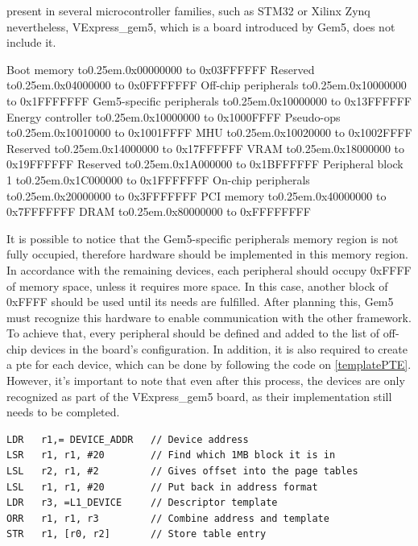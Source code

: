 present in several microcontroller families, such as STM32 \cite{referenceManualRM0385} or Xilinx Zynq \cite{xilinx2014zynq} 
nevertheless, VExpress\_gem5, which is a board introduced by Gem5, does not include it.


\def\mydots{\xleaders\hbox to0.25em{\hfill.\hfill}\hfill}

\begin{outline}[enumerate]
	\1 Boot memory 						\mydots 	0x00000000 to 0x03FFFFFF
	\1 Reserved							\mydots 	0x04000000 to 0x0FFFFFFF
	\1 Off-chip peripherals				\mydots 	0x10000000 to 0x1FFFFFFF
		\2 Gem5-specific peripherals	\mydots 	0x10000000 to 0x13FFFFFF
			\3 Energy controller 		\mydots 	0x10000000 to 0x1000FFFF
			\3 Pseudo-ops				\mydots		0x10010000 to 0x1001FFFF
			\3 MHU						\mydots		0x10020000 to 0x1002FFFF
		\2 Reserved 					\mydots 	0x14000000 to 0x17FFFFFF
		\2 VRAM							\mydots		0x18000000 to 0x19FFFFFF
		\2 Reserved 					\mydots		0x1A000000 to 0x1BFFFFFF
		\2 Peripheral block 1			\mydots		0x1C000000 to 0x1FFFFFFF
	\1 On-chip  peripherals				\mydots 	0x20000000 to 0x3FFFFFFF
	\1 PCI memory 						\mydots 	0x40000000 to 0x7FFFFFFF
	\1 DRAM								\mydots 	0x80000000 to 0xFFFFFFFF
\end{outline}

It is possible to notice that the Gem5-specific peripherals memory region is not fully occupied, therefore hardware should be implemented 
in this memory region. In accordance with the remaining devices, each peripheral should occupy 0xFFFF of memory space, unless it requires
more space. In this case, another block of 0xFFFF should be used until its needs are fulfilled. After planning this, Gem5 must recognize 
this hardware to enable communication with the other framework. 
To achieve that, every peripheral should be defined and added to the list of off-chip devices in the 
board's configuration. In addition, it is also required to create a \gls{pte} for each device, which can be done by following the
code on \ref{templatePTE}. However, it's important to note that even after this process, the devices are only recognized as part of the 
VExpress\_gem5 board, as their implementation still needs to be completed.

\hspace{1cm}

\begin{lstlisting}[style=customasm, caption={Template for a \gls{pte}}, label=templatePTE]
LDR   r1,= DEVICE_ADDR	 // Device address
LSR   r1, r1, #20        // Find which 1MB block it is in
LSL   r2, r1, #2         // Gives offset into the page tables
LSL   r1, r1, #20        // Put back in address format
LDR   r3, =L1_DEVICE     // Descriptor template
ORR   r1, r1, r3         // Combine address and template
STR   r1, [r0, r2]       // Store table entry
\end{lstlisting}


